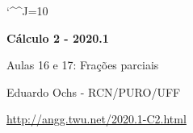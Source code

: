 \documentclass[oneside,12pt]{article}
\begin{document}
\catcode`\^^J=10


\long{}
\long{}
\long{}
\long{}
\long{}
\long{}
\long{}
\long{}
\long{}
\long{}

\long{}
\long{}

\def\frown{\ensuremath{{=}{(}}}
\def\True {\mathbf{V}}
\def\False{\mathbf{F}}
\def\D    {\displaystyle}

\def\drafturl{http://angg.twu.net/LATEX/2020-1-C2.pdf}
\def\drafturl{http://angg.twu.net/2020.1-C2.html}
\def\draftfooter{\tiny \href{\drafturl}{\jobname{}} \ColorBrown{\shorttoday{} \hours}}



%

\thispagestyle{empty}

\begin{center}

\vspace*{1.2cm}

{\bf \Large Cálculo 2 - 2020.1}

\bsk

Aulas 16 e 17: Frações parciais

\bsk

Eduardo Ochs - RCN/PURO/UFF

\url{http://angg.twu.net/2020.1-C2.html}

\end{center}
\end{document}
